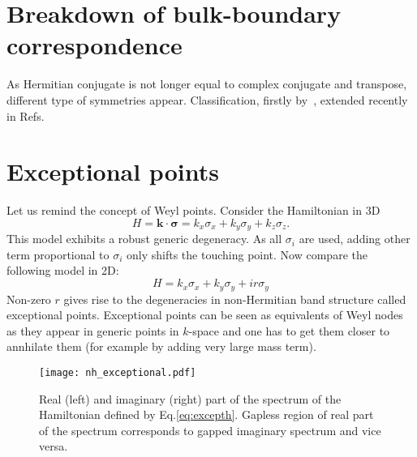 \section{Breakdown of bulk-boundary correspondence}


As Hermitian conjugate is not longer equal to complex conjugate and transpose, different type of symmetries appear. Classification, firstly by~\cite{Bernard_2002}, extended recently in Refs.~\cite{PhysRevLett.120.146402, PhysRevX.8.031079, PhysRevB.99.125103}



\section{Exceptional points}
Let us remind the concept of Weyl points. Consider the Hamiltonian in 3D
\begin{equation}
H =\mathbf{k} \cdot \boldsymbol{\sigma} = k_x \sigma_x + k_y \sigma_y + k_z \sigma_z.
\label{eq:weylh}
\end{equation}
This model exhibits a robust generic degeneracy. As all $\sigma_i$ are used, adding other term proportional to $\sigma_i$ only shifts the touching point. Now compare the following model in 2D:
\begin{equation}
H = k_x \sigma_x + k_y \sigma_y + i r \sigma_y
\label{eq:excepth}
\end{equation}
Non-zero $r$ gives rise to  the degeneracies in non-Hermitian band structure called exceptional points. Exceptional points can be seen as equivalents of Weyl nodes as they appear in generic points in $k$-space and one has to get them closer to annhilate them (for example by adding very large mass term).

\begin{figure}
\centering
\texttt{[image: nh\_exceptional.pdf]}
\caption{Real (left) and imaginary (right) part of the spectrum of the Hamiltonian defined by Eq.\eqref{eq:excepth}. Gapless region of real part of the spectrum corresponds to gapped imaginary spectrum and vice versa.}
\label{fig:excepth}
\end{figure}


